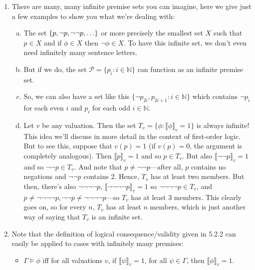 \begin{enumerate}[\thesection.1]
		\item There are many, many infinite premise sets you can imagine, here we give just a few examples to show you what we're dealing with:
		
		\begin{enumerate}[(a)]
		
			\item The set $\{p, \neg p, \neg\neg p, \mathellipsis\}$ or more precisely the smallest set $X$ such that $p\in X$ and if $\phi\in X$ then $\neg \phi\in X$. To have this infinite set, we don't even need infinitely many sentence letters.
			
			\item But if we do, the set $\mathcal{P}=\{p_i: i\in \mathbb{N}\}$ can function as an infinite premise set.
			
			\item So, we can also have a set like this $\{\neg p_{2i}, p_{2i+1}: i\in\mathbb{N}\}$ which contains $\neg p_i$ for each even $i$ and $p_i$ for each odd $i\in\mathbb{N}$.
			
			\item Let $v$ be any valuation. Then the set $T_v=\{\phi:\llbracket\phi\rrbracket_v=1\}$ is always infinite! This idea we'll discuss in more detail in the context of first-order logic. But to see this, suppose that $v(p)=1$ (if $v(p)=0$, the argument is completely analogous). Then $\llbracket p\rrbracket_v=1$ and so $p\in T_v$. But also $\llbracket \neg\neg p\rrbracket_v=1$ and so $\neg\neg p\in T_v$. And note that $p\neq \neg\neg p$---after all, $p$ contains no negations and $\neg\neg p$ contains 2. Hence, $T_v$ has at least two members. But then, there's also $\neg\neg\neg\neg p$, $\llbracket \neg\neg\neg\neg p\rrbracket_v=1$ so $\neg\neg\neg\neg p\in T_v$, and $p\neq \neg\neg\neg\neg p, \neg\neg p\neq \neg\neg\neg\neg p$---so $T_v$ has at least 3 members. This clearly goes on, so for every $n$, $T_v$ has at least $n$ members, which is just another way of saying that $T_v$ is an infinite set.
		
		\end{enumerate}
		
		\item Note that the definition of logical consequence/validity given in 5.2.2 can easily be applied to cases with infinitely many premises:
				\begin{itemize}
		
			\item $\Gamma\vDash\phi$ iff for all valuations $v$, if $\llbracket\psi\rrbracket_v=1$, for all $\psi\in\Gamma$, then $\llbracket\phi\rrbracket_v=1$.
		

\end{itemize}
\end{enumerate}
